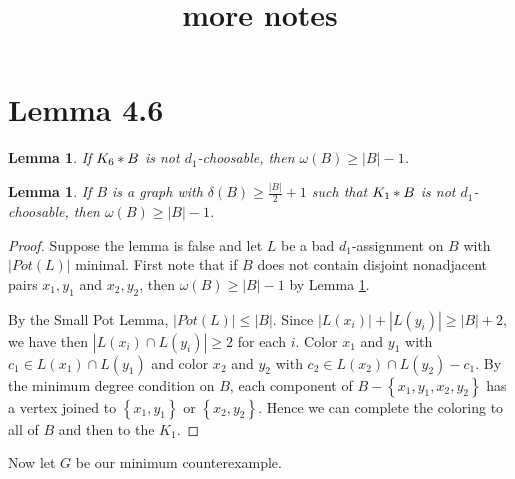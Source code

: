 \documentclass[12pt]{amsart}
\title{more notes}
\theoremstyle{plain}
\newtheorem{lem}[thm]{Lemma}
\theoremstyle{definition}
\theoremstyle{plain}
\newcommand{\set}[1]{\left\{ #1 \right\}}
\newcommand{\card}[1]{\left|#1\right|}
\newcommand{\join}[2]{#1 \mbox{\hspace{2 pt}$\ast$\hspace{2 pt}} #2}
\begin{document}
\maketitle

\section{Lemma 4.6}

\begin{lem}\label{K6Possibilities}
If $\join{K_6}{B}$ is not $d_1$-choosable, then $\omega(B) \geq \card{B} - 1$.
\end{lem}

\begin{lem}\label{neighborhood}
If $B$ is a graph with $\delta(B) \geq \frac{\card{B}}{2} + 1$ such that
$\join{K_1}{B}$ is not $d_1$-choosable, then $\omega(B) \geq \card{B} - 1$.
\end{lem}
\begin{proof}
Suppose the lemma is false and let $L$ be a bad $d_1$-assignment on $B$ with $\card{Pot(L)}$ minimal. First note that if $B$ does not contain disjoint nonadjacent pairs $x_1, y_1$
and $x_2, y_2$, then $\omega(B) \geq \card{B} - 1$ by Lemma \ref{K6Possibilities}.

By the Small Pot Lemma, $\card{Pot(L)} \leq \card{B}$.  Since $\card{L(x_i)} +
\card{L(y_i)} \geq \card{B} + 2$, we have then $\card{L(x_i) \cap L(y_i)} \geq 2$ for each $i$.  Color $x_1$ and $y_1$ with $c_1 \in L(x_1) \cap L(y_1)$ and color $x_2$ and $y_2$ with $c_2 \in L(x_2) \cap L(y_2) - c_1$.  By the minimum degree condition on $B$, each component of $B - \set{x_1, y_1, x_2, y_2}$ has a vertex joined to $\set{x_1, y_1}$ or $\set{x_2, y_2}$.  Hence we can complete the coloring to all of $B$ and then to the $K_1$.
\end{proof}

Now let $G$ be our minimum counterexample.
\end{document}
